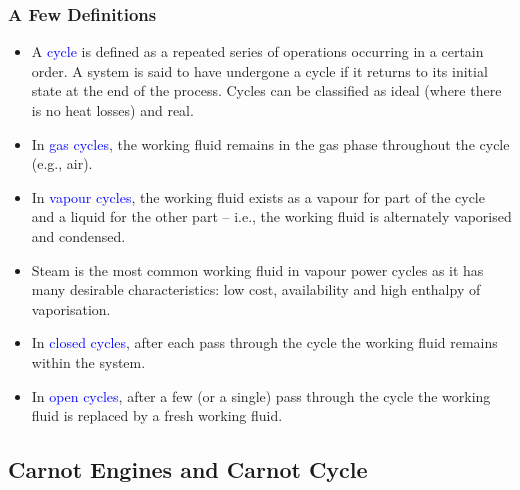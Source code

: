 \documentclass[10pt,compress,handout,ignorenonframetext]{beamer}
\begin{document}
\begin{frame}
 \frametitle{A Few Definitions}
 \begin{itemize}
  \item <1-> A \textcolor{blue}{cycle} is defined as a repeated series of operations occurring in a certain order. A system is said to have undergone a cycle if it returns to its initial state at the end of the process.  Cycles can be classified as ideal (where there is no heat losses) and real. 
  \item <2-> In \textcolor{blue}{gas cycles}, the working fluid remains in the gas phase throughout the cycle (e.g., air).
  \item <3-> In \textcolor{blue}{vapour cycles}, the working fluid exists as a vapour for part of the cycle and a liquid for the other part -- i.e., the working fluid is alternately vaporised and condensed.
  \item <4-> Steam is the most common working fluid in vapour power cycles as it has many desirable characteristics: low cost, availability and high enthalpy of vaporisation.
  \item <5-> In \textcolor{blue}{closed cycles}, after each pass through the cycle the working fluid remains within the system.
  \item <6-> In \textcolor{blue}{open cycles}, after a few (or a single) pass through the cycle the working fluid is replaced by a fresh working fluid.
 \end{itemize}
\end{frame}


\subsection{Carnot Engines and Carnot Cycle}
\end{document}
